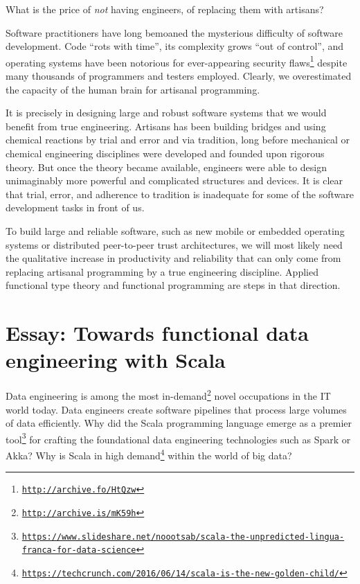 What is the price of \emph{not} having engineers, of replacing them
with artisans?

Software practitioners have long bemoaned the mysterious difficulty
of software development. Code \textsf{``}rots with time\textsf{''}, its complexity
grows \textsf{``}out of control\textsf{''}, and operating systems have been notorious
for ever-appearing security flaws\footnote{\texttt{\href{http://archive.fo/HtQzw}{http://archive.fo/HtQzw}}}
despite many thousands of programmers and testers employed. Clearly,
we overestimated the capacity of the human brain for artisanal programming.

It is precisely in designing large and robust software systems that
we would benefit from true engineering. Artisans has been building
bridges and using chemical reactions by trial and error and via tradition,
long before mechanical or chemical engineering disciplines were developed
and founded upon rigorous theory. But once the theory became available,
engineers were able to design unimaginably more powerful and complicated
structures and devices. It is clear that trial, error, and adherence
to tradition is inadequate for some of the software development tasks
in front of us. 

To build large and reliable software, such as new mobile or embedded
operating systems or distributed peer-to-peer trust architectures,
we will most likely need the qualitative increase in productivity
and reliability that can only come from replacing artisanal programming
by a true engineering discipline. Applied functional type theory and
functional programming are steps in that direction.

\chapter{Essay: Towards functional data engineering with Scala}

Data engineering is among the most in-demand\footnote{\texttt{\href{http://archive.is/mK59h}{http://archive.is/mK59h}}}
novel occupations in the IT world today. Data engineers create software
pipelines that process large volumes of data efficiently. Why did
the Scala programming language emerge as a premier tool\footnote{\texttt{\href{https://www.slideshare.net/noootsab/scala-the-unpredicted-lingua-franca-for-data-science}{https://www.slideshare.net/noootsab/scala-the-unpredicted-lingua-franca-for-data-science}}}
for crafting the foundational data engineering technologies such as
Spark or Akka? Why is Scala in high demand\footnote{\texttt{\href{https://techcrunch.com/2016/06/14/scala-is-the-new-golden-child/}{https://techcrunch.com/2016/06/14/scala-is-the-new-golden-child/}}}
within the world of big data?

